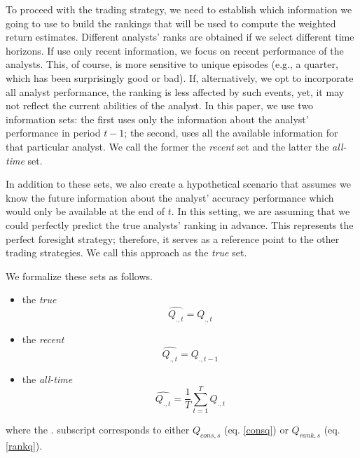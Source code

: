 \documentclass{book}
\newcommand{\tr}{\textit{true}}
\newcommand{\naive}{\textit{recent}}
\newcommand{\default}{\textit{all-time}}
\begin{document}
To proceed with the trading strategy, we need to establish which information we going to use to build the rankings that will be used to compute the weighted return estimates. Different analysts' ranks are obtained  if we select different time horizons. If use only recent information, we focus on recent performance of the analysts. This, of course, is more sensitive to unique episodes (e.g., a quarter, which has been surprisingly good or bad). If, alternatively, we opt to incorporate all analyst performance, the ranking is less affected by such events, yet, it may not reflect the current abilities of the analyst. In this paper, we use two information sets: the first uses only the  information about the analyst' performance in period $t-1$; the second, uses all the available  information for that particular analyst. We call the former the \naive{} set and the latter the \default{} set. 

In addition to these sets,  we also create a hypothetical scenario that assumes we know the future information about the analyst' accuracy performance which would only be available at the end of $t$. In this setting, we are assuming that we could  perfectly predict the true analysts' ranking in advance. This represents the perfect foresight strategy; therefore, it serves as a reference point to the other trading strategies. We call this approach as the \tr{} set. 

We formalize these sets as follows. 
\begin{itemize}
\item  the \tr{} %
\begin{equation}
\label{q:true}
\widehat{Q_{.,t}}=Q_{.,t}
\end{equation}

\item  the \naive{} %
\begin{equation}
\label{q:naive}
\widehat{Q_{.,t}}=Q_{.,t-1}
\end{equation}

\item  the \default{} %
\begin{equation}
\label{q:default}
\widehat{Q_{.,t}} = \frac{1}{T} \sum_{t=1}^{T} Q_{.,t}
\end{equation}
\end{itemize}
where the $.$ subscript corresponds to either $Q_{cons,s}$ (eq. \ref{consq}) or $Q_{rank,s}$ (eq. \ref{rankq}).
\end{document}
